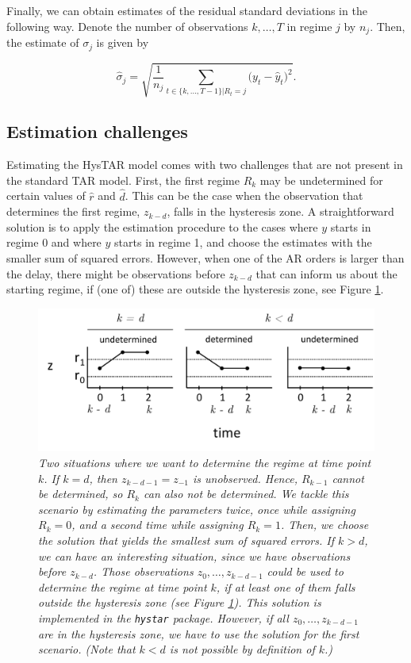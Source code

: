 \documentclass{article}
\begin{document}
Finally, we can obtain estimates of the residual standard deviations in the following way. Denote the number of observations $k, \dots, T$ in regime $j$ by $n_j$. Then, the estimate of $\sigma_{j}$ is given by

\begin{equation}
\hat{\sigma}_{j} = \sqrt{\frac{1}{n_j} \sum_{t \in \{k, \dots, T-1\}| R_t = j} \big(y_t - \hat{y}_t \big)^2}.
\end{equation} 

\subsection{Estimation challenges}
Estimating the HysTAR model comes with two challenges that are not present in the standard TAR model.
First, the first regime $R_k$ may be undetermined for certain values of $\hat{r}$ and $\hat{d}$. 
This can be the case when the observation that determines the first regime, $z_{k-d}$, falls in the hysteresis zone.
A straightforward solution is to apply the estimation procedure to the cases where $y$ starts in regime 0 and where $y$ starts in regime 1, and choose the estimates with the smaller sum of squared errors.
However, when one of the AR orders is larger than the delay, there might be observations before $z_{k-d}$ that can inform us about the starting regime, if (one of) these are outside the hysteresis zone, see Figure \ref{fig:unknown_start}.

\begin{figure}
\begin{center}
\includegraphics[scale=.6]{unknown_start}
\caption{\textit{Two situations where we want to determine the regime at time point $k$. 
If $k = d$, then $z_{k-d-1} = z_{-1}$ is unobserved. Hence, $R_{k-1}$ cannot be determined, so $R_{k}$ can also not be determined. We tackle this scenario by estimating the parameters twice, once while assigning $R_k = 0$, and a second time while assigning $R_k = 1$. Then, we choose the solution that yields the smallest sum of squared errors.
If $k > d$, we can have an interesting situation, since we have observations before $z_{k-d}$. 
Those observations $z_{0}, \dots, z_{k - d - 1}$ could be used to determine the regime at time point $k$, if at least one of them falls outside the hysteresis zone (see Figure \ref{fig:unknown_start}). This solution is implemented in the \texttt{hystar} package. 
However, if all $z_{0}, \dots, z_{k - d - 1}$ are in the hysteresis zone, we have to use the solution for the first scenario. (Note that $k < d$ is not possible by definition of $k$.)}}
\label{fig:unknown_start}
\end{center}
\end{figure}
\end{document}
